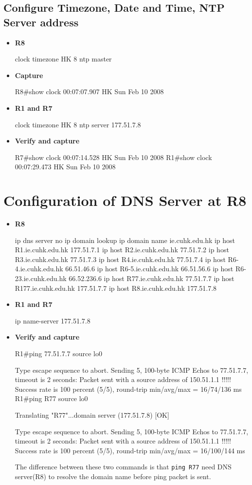 \documentclass[10pt]{article}
\begin{document}
\subsection{Configure Timezone, Date and Time, NTP Server address}
\begin{itemize}
\item {\bf R8}
\begin{verbatim*}
clock timezone HK 8
ntp master
\end{verbatim*}
\item {\bf Capture}
\begin{verbatim*}
R8#show clock
00:07:07.907 HK Sun Feb 10 2008
\end{verbatim*}
\item {\bf R1 and R7}
\begin{verbatim*}
clock timezone HK 8
ntp server 177.51.7.8
\end{verbatim*}
\item {\bf Verify and capture}
\begin{verbatim*}
R7#show clock
00:07:14.528 HK Sun Feb 10 2008
R1#show clock
00:07:29.473 HK Sun Feb 10 2008
\end{verbatim*}
\end{itemize}
\section{Configuration of DNS Server at R8}
\begin{itemize}
\item {\bf R8}
\begin{verbatim*}
ip dns server
no ip domain lookup
ip domain name ie.cuhk.edu.hk
ip host R1.ie.cuhk.edu.hk 177.51.7.1
ip host R2.ie.cuhk.edu.hk 77.51.7.2
ip host R3.ie.cuhk.edu.hk 77.51.7.3
ip host R4.ie.cuhk.edu.hk 77.51.7.4
ip host R6-4.ie.cuhk.edu.hk 66.51.46.6
ip host R6-5.ie.cuhk.edu.hk 66.51.56.6
ip host R6-23.ie.cuhk.edu.hk 66.52.236.6
ip host R77.ie.cuhk.edu.hk 77.51.7.7
ip host R177.ie.cuhk.edu.hk 177.51.7.7
ip host R8.ie.cuhk.edu.hk 177.51.7.8
\end{verbatim*}
\item {\bf R1 and R7}
\begin{verbatim*}
ip name-server 177.51.7.8
\end{verbatim*}
\item {\bf Verify and capture}
\begin{verbatim*}
R1#ping 77.51.7.7 source lo0

Type escape sequence to abort.
Sending 5, 100-byte ICMP Echos to 77.51.7.7, timeout is 2 seconds:
Packet sent with a source address of 150.51.1.1
!!!!!
Success rate is 100 percent (5/5), round-trip min/avg/max = 16/74/136 ms
R1#ping R77 source lo0

Translating "R77"...domain server (177.51.7.8) [OK]

Type escape sequence to abort.
Sending 5, 100-byte ICMP Echos to 77.51.7.7, timeout is 2 seconds:
Packet sent with a source address of 150.51.1.1
!!!!!
Success rate is 100 percent (5/5), round-trip min/avg/max = 16/100/144 ms
\end{verbatim*}
The difference between these two commands is that {\tt ping R77} need DNS server(R8) to resolve the domain name before ping packet is sent. 
\end{itemize}
\end{document}
